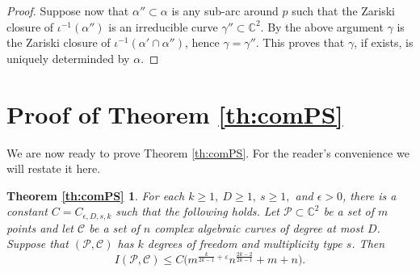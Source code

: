 \documentclass[letterpaper, reqno,11pt]{article}
\newtheorem*{comPStheorem}{Theorem \ref{th:comPS}}
\theoremstyle{remark}
\newcommand{\CC}{\mathbb{C}}
\newcommand{\pts}{\mathcal P}
\newcommand{\curves}{\mathcal C}
\newcommand{\eps}{\varepsilon}
\begin{document}
\begin{proof}
Suppose now that $\alpha''\subset\alpha$ is any sub-arc
around $p$ such that the Zariski closure of $\iota^{-1}(\alpha'')$
is an irreducible curve $\gamma''\subset\CC^2$.
By the above argument $\gamma$ is the Zariski closure of
$\iota^{-1}(\alpha'\cap\alpha'')$,
hence $\gamma=\gamma''$.
This proves that $\gamma$, if exists, is uniquely determinded by $\alpha$.
\end{proof}

%
%
%
%
\section{Proof of Theorem \ref{th:comPS}}\label{proofOfThmSection}
We are now ready to prove Theorem \ref{th:comPS}. For the reader's convenience we will restate it here.
\begin{comPStheorem}
For each $k\geq 1,\ D\geq 1,\ s\geq 1,$ and $\epsilon>0$, there is a constant $C=C_{\epsilon,D,s,k}$ such that the following holds. Let $\pts\subset\CC^2$ be a set of $m$ points and let $\curves$ be a set of $n$ complex algebraic curves of degree at most $D$. Suppose that $(\pts,\curves)$ has $k$ degrees of freedom and multiplicity type $s$. Then
\begin{equation*}
I(\pts,\curves) \le C\big(m^{\frac{k}{2k-1}+\eps}n^{\frac{2k-2}{2k-1}}+m+n\big).
\end{equation*}
\end{comPStheorem}
\end{document}
